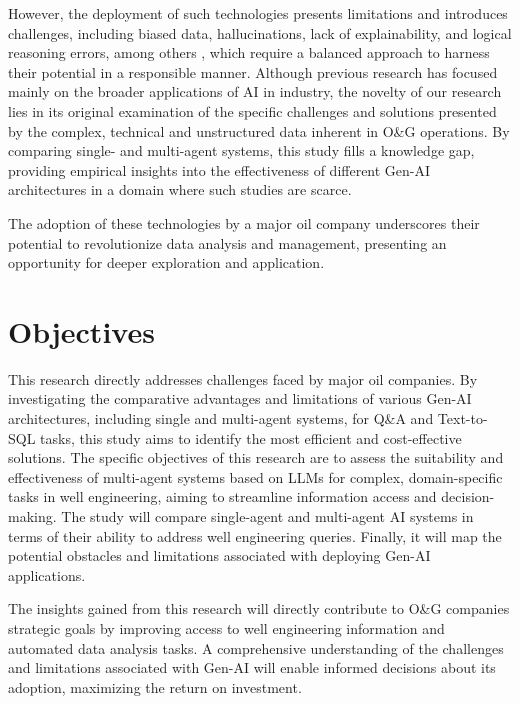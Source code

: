    However, the deployment of such technologies presents limitations and introduces challenges, including biased data, hallucinations, lack of explainability, and logical reasoning errors, among others \cite{Hadi2023}, which require a balanced approach to harness their potential in a responsible manner.    
    Although previous research has focused mainly on the broader applications of AI in industry, the novelty of our research lies in its original examination of the specific challenges and solutions presented by the complex, technical and unstructured data inherent in O\&G operations. By comparing single- and multi-agent systems, this study fills a knowledge gap, providing empirical insights into the effectiveness of different Gen-AI architectures in a domain where such studies are scarce. 
    
    The adoption of these technologies by a major oil company underscores their potential to revolutionize data analysis and management, presenting an opportunity for deeper exploration and application.


\section{Objectives}

    This research directly addresses challenges faced by major oil companies. By investigating the comparative advantages and limitations of various Gen-AI architectures, including single and multi-agent systems, for Q\&A and Text-to-SQL tasks, this study aims to identify the most efficient and cost-effective solutions.
    The specific objectives of this research are to assess the suitability and effectiveness of multi-agent systems based on LLMs for complex, domain-specific tasks in well engineering, aiming to streamline information access and decision-making. 
    The study will compare single-agent and multi-agent AI systems in terms of their ability to address well engineering queries. Finally, it will map the potential obstacles and limitations associated with deploying Gen-AI applications.
            
    The insights gained from this research will directly contribute to O\&G companies strategic goals by improving access to well engineering information and automated data analysis tasks. 
    A comprehensive understanding of the challenges and limitations associated with Gen-AI will enable informed decisions about its adoption, maximizing the return on investment. 

